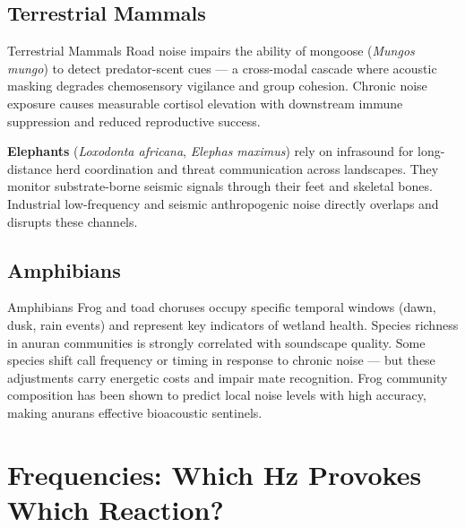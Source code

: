 \documentclass[12pt, a4paper]{article}
\begin{document}
\subsection{Terrestrial Mammals}

\begin{speciesbox}{Terrestrial Mammals}
Road noise impairs the ability of mongoose (\textit{Mungos mungo}) to detect predator-scent
cues --- a cross-modal cascade where acoustic masking degrades chemosensory vigilance and group
cohesion. Chronic noise exposure causes measurable cortisol elevation with downstream immune
suppression and reduced reproductive success.

\medskip
\textbf{Elephants} (\textit{Loxodonta africana}, \textit{Elephas maximus}) rely on infrasound
for long-distance herd coordination and threat communication across landscapes. They monitor
substrate-borne seismic signals through their feet and skeletal bones. Industrial low-frequency
and seismic anthropogenic noise directly overlaps and disrupts these channels.
\end{speciesbox}

\subsection{Amphibians}

\begin{speciesbox}{Amphibians}
Frog and toad choruses occupy specific temporal windows (dawn, dusk, rain events) and represent
key indicators of wetland health. Species richness in anuran communities is strongly correlated
with soundscape quality. Some species shift call frequency or timing in response to chronic noise
--- but these adjustments carry energetic costs and impair mate recognition. Frog community
composition has been shown to predict local noise levels with high accuracy, making anurans
effective bioacoustic sentinels.
\end{speciesbox}

\newpage

\section{Frequencies: Which Hz Provokes Which Reaction?}
\end{document}
